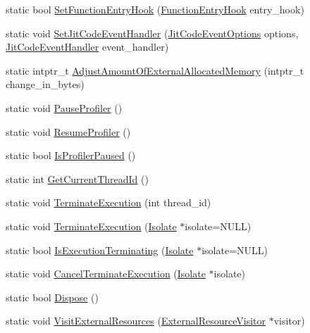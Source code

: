 \begin{DoxyCompactItemize}
\item 
static bool \hyperlink{classv8_1_1_v8_a3ec653c7112dc2f50675712e976b9d9c}{Set\+Function\+Entry\+Hook} (\hyperlink{namespacev8_aaf07fb6bb13f295da3c6568938b7dec5}{Function\+Entry\+Hook} entry\+\_\+hook)
\item 
static void \hyperlink{classv8_1_1_v8_abf1b71bf2e3cb73fa44c6939bd70ab5e}{Set\+Jit\+Code\+Event\+Handler} (\hyperlink{namespacev8_a06f34fa4fa4cfc8518366808d1d461c1}{Jit\+Code\+Event\+Options} options, \hyperlink{namespacev8_a39243bc91e63d64d111452fdb98c4733}{Jit\+Code\+Event\+Handler} event\+\_\+handler)
\item 
static intptr\+\_\+t \hyperlink{classv8_1_1_v8_ab9532c940926018bc1e88ed21662395f}{Adjust\+Amount\+Of\+External\+Allocated\+Memory} (intptr\+\_\+t change\+\_\+in\+\_\+bytes)
\item 
static void \hyperlink{classv8_1_1_v8_a5fefebea0cd37105837a9d267baf2e5c}{Pause\+Profiler} ()
\item 
static void \hyperlink{classv8_1_1_v8_ab0557aaba62c7fb253fe838003aa60af}{Resume\+Profiler} ()
\item 
static bool \hyperlink{classv8_1_1_v8_aa8dc5a7c3a059bb376882ac36b9df775}{Is\+Profiler\+Paused} ()
\item 
static int \hyperlink{classv8_1_1_v8_a6b73813e84728c2a91f61ef45e48d80c}{Get\+Current\+Thread\+Id} ()
\item 
static void \hyperlink{classv8_1_1_v8_af7d845e6f55eb76085d5ff3601780986}{Terminate\+Execution} (int thread\+\_\+id)
\item 
static void \hyperlink{classv8_1_1_v8_a81a47f6709c7d376a448d6315398aeb8}{Terminate\+Execution} (\hyperlink{classv8_1_1_isolate}{Isolate} $\ast$isolate=N\+U\+L\+L)
\item 
static bool \hyperlink{classv8_1_1_v8_a8e0ad59109f022ecca7121e2ea990997}{Is\+Execution\+Terminating} (\hyperlink{classv8_1_1_isolate}{Isolate} $\ast$isolate=N\+U\+L\+L)
\item 
static void \hyperlink{classv8_1_1_v8_ac2fb064870a2ca3bf6f7933c3dff6d85}{Cancel\+Terminate\+Execution} (\hyperlink{classv8_1_1_isolate}{Isolate} $\ast$isolate)
\item 
static bool \hyperlink{classv8_1_1_v8_a566450d632c0a63770682b9da3cae08d}{Dispose} ()
\item 
static void \hyperlink{classv8_1_1_v8_a1fd57739642c8304dc8a34dd283da840}{Visit\+External\+Resources} (\hyperlink{classv8_1_1_external_resource_visitor}{External\+Resource\+Visitor} $\ast$visitor)
\item 

\end{DoxyCompactItemize}
